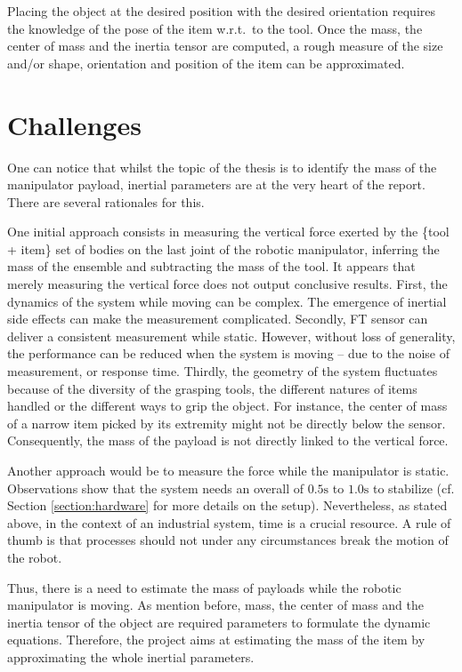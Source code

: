 \documentclass[/home/francois/latex/report/main.tex]{subfiles}
\begin{document}
Placing the object at the desired position with the desired orientation requires the knowledge of the pose of the item w.r.t.\ to the tool. Once the mass, the center of mass and the inertia tensor are computed, a rough measure of the size and/or shape, orientation and position of the item can be approximated.

\section{Challenges}

One can notice that whilst the topic of the thesis is to identify the mass of the manipulator payload, inertial parameters are at the very heart of the report. There are several rationales for this.

One initial approach consists in measuring the vertical force exerted by the \{tool + item\} set of bodies on the last joint of the robotic manipulator, inferring the mass of the ensemble and subtracting the mass of the tool. It appears that merely measuring the vertical force does not output conclusive results. First, the dynamics of the system while moving can be complex. The emergence of inertial side effects can make the measurement complicated. Secondly, \ac{FT} sensor can deliver a consistent measurement while static. However, without loss of generality, the performance can be reduced when the system is moving – due to the noise of measurement, or response time. Thirdly, the geometry of the system fluctuates because of the diversity of the grasping tools, the different natures of items handled or the different ways to grip the object. For instance, the center of mass of a narrow item picked by its extremity might not be directly below the sensor. Consequently, the mass of the payload is not directly linked to the vertical force.

Another approach would be to measure the force while the manipulator is static. Observations show that the system needs an overall of $0.5 \si{\second}$ to $1.0 \si{\second}$ to stabilize (cf. Section \ref{section:hardware} for more details on the setup). Nevertheless, as stated above, in the context of an industrial system, time is a crucial resource. A rule of thumb is that processes should not under any circumstances break the motion of the robot.

Thus, there is a need to estimate the mass of payloads while the robotic manipulator is moving. As mention before, mass, the center of mass and the inertia tensor of the object are required parameters to formulate the dynamic equations. Therefore, the project aims at estimating the mass of the item by approximating the whole inertial parameters.
\end{document}
